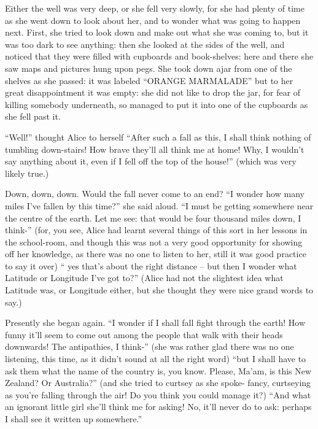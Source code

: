 \documentclass{l3proj}
\begin{document}
Either the well was very deep, or she fell very slowly, for she had plenty
of time as she went down to look about her, and to wonder what was going to
happen next. First, she tried to look down and make out what she was coming
to, but it was too dark to see anything: then she looked at the sides of
the well, and noticed that they were filled with cupboards and
book-shelves: here and there she saw maps and pictures hung upon pegs. She
took down ajar from one of the shelves as she passed: it was labeled
``ORANGE MARMALADE'' but to her great disappointment it was empty: she did
not like to drop the jar, for fear of killing somebody underneath, so
managed to put it into one of the cupboards as she fell past it.

``Well!'' thought Alice to herself ``After such a fall as this, I shall think
nothing of tumbling down-stairs! How brave they'll all think me at home!
Why, I wouldn't say anything about it, even if I fell off the top of the
house!'' (which was very likely true.)

Down, down, down. Would the fall never come to an end? ``I wonder how many
miles I've fallen by this time?'' she said aloud. ``I must be getting
somewhere near the centre of the earth. Let me see: that would be four
thousand miles down, I think-'' (for, you see, Alice had learnt several
things of this sort in her lessons in the school-room, and though this was
not a very good opportunity for showing off her knowledge, as there was no
one to listen to her, still it was good practice to say it over) `` yes
that's about the right distance -- but then I wonder what Latitude or
Longitude I've got to?'' (Alice had not the slightest idea what Latitude
was, or Longitude either, but she thought they were nice grand words to
say.)

Presently she began again. ``I wonder if I shall fall fight through the
earth! How funny it'll seem to come out among the people that walk with
their heads downwards! The antipathies, I think-'' (she was rather glad
there was no one listening, this time, as it didn't sound at all the right
word) ``but I shall have to ask them what the name of the country is, you
know. Please, Ma'am, is this New Zealand? Or Australia?'' (and she tried to
curtsey as she spoke- fancy, curtseying as you're falling through the air!
Do you think you could manage it?) ``And what an ignorant little girl she'll
think me for asking! No, it'll never do to ask: perhaps I shall see it
written up somewhere.''
\end{document}
